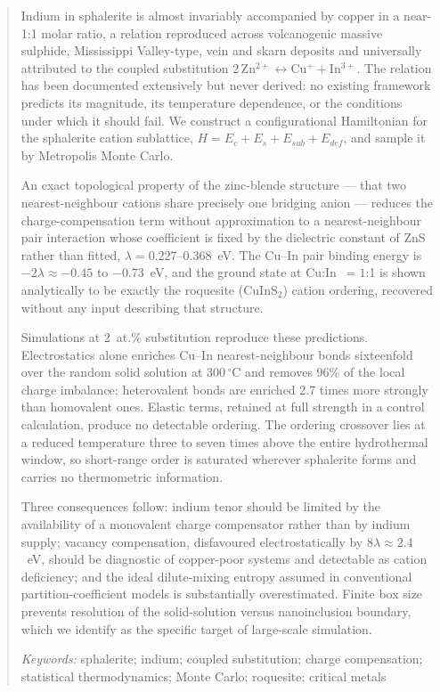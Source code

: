 \documentclass[11pt,a4paper]{article}
\begin{document}
\begin{abstract}
\noindent
Indium in sphalerite is almost invariably accompanied by copper in a near-1:1
molar ratio, a relation reproduced across volcanogenic massive sulphide,
Mississippi Valley-type, vein and skarn deposits and universally attributed to
the coupled substitution
$2\,\mathrm{Zn^{2+}} \leftrightarrow \mathrm{Cu^{+}} + \mathrm{In^{3+}}$. The
relation has been documented extensively but never derived: no existing
framework predicts its magnitude, its temperature dependence, or the conditions
under which it should fail. We construct a configurational Hamiltonian for the
sphalerite cation sublattice, $H = E_c + E_s + E_{sub} + E_{def}$, and sample it
by Metropolis Monte Carlo.

An exact topological property of the zinc-blende structure --- that two
nearest-neighbour cations share precisely one bridging anion --- reduces the
charge-compensation term without approximation to a nearest-neighbour pair
interaction whose coefficient is fixed by the dielectric constant of ZnS rather
than fitted, $\lambda = 0.227$--$0.368$~eV. The Cu--In pair binding energy is
$-2\lambda \approx -0.45$ to $-0.73$~eV, and the ground state at Cu:In~$=1$:1 is
shown analytically to be exactly the roquesite ($\mathrm{CuInS_2}$) cation
ordering, recovered without any input describing that structure.

Simulations at 2~at.\% substitution reproduce these predictions. Electrostatics
alone enriches Cu--In nearest-neighbour bonds sixteenfold over the random solid
solution at $300\,^\circ$C and removes 96\% of the local charge imbalance;
heterovalent bonds are enriched 2.7 times more strongly than homovalent ones.
Elastic terms, retained at full strength in a control calculation, produce no
detectable ordering. The ordering crossover lies at a reduced temperature three
to seven times above the entire hydrothermal window, so short-range order is
saturated wherever sphalerite forms and carries no thermometric information.

Three consequences follow: indium tenor should be limited by the availability of
a monovalent charge compensator rather than by indium supply; vacancy
compensation, disfavoured electrostatically by $8\lambda \approx 2.4$~eV, should
be diagnostic of copper-poor systems and detectable as cation deficiency; and
the ideal dilute-mixing entropy assumed in conventional partition-coefficient
models is substantially overestimated. Finite box size prevents resolution of
the solid-solution versus nanoinclusion boundary, which we identify as the
specific target of large-scale simulation.

\vspace{4pt}
\noindent\textit{Keywords:} sphalerite; indium; coupled substitution; charge
compensation; statistical thermodynamics; Monte Carlo; roquesite; critical
metals
\end{abstract}
\end{document}
